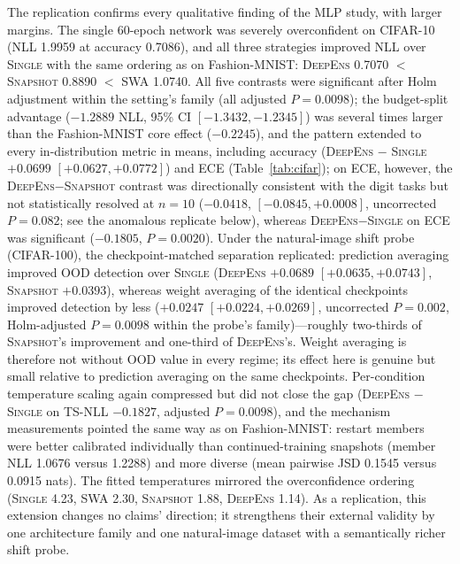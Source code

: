 \documentclass[11pt,a4paper]{article}
\newcommand{\deepens}{\textsc{DeepEns}}
\newcommand{\snapshot}{\textsc{Snapshot}}
\newcommand{\swa}{\textsc{SWA}}
\newcommand{\single}{\textsc{Single}}
\newcommand{\ts}{\textsc{TS}}
\begin{document}
The replication confirms every qualitative finding of the MLP study, with
larger margins. The single 60-epoch network was severely overconfident on
CIFAR-10 (NLL 1.9959 at accuracy 0.7086), and all three
strategies improved NLL over \single{} with the same ordering as on
Fashion-MNIST: \deepens{} 0.7070 $<$ \snapshot{} 0.8890 $<$ \swa{} 1.0740.
All five contrasts were significant after Holm adjustment within the
setting's family (all adjusted $P=0.0098$); the budget-split advantage
($-1.2889$ NLL, 95\% CI $[-1.3432,-1.2345]$) was several times larger than the
Fashion-MNIST core effect ($-0.2245$), and the pattern extended to every
in-distribution metric in means, including accuracy (\deepens{} $-$ \single{} $+0.0699$
$[+0.0627,+0.0772]$) and ECE (Table~\ref{tab:cifar}); on ECE, however, the
\deepens$-$\snapshot{} contrast was directionally consistent with the digit
tasks but not statistically resolved at $n=10$ ($-0.0418$,
$[-0.0845,+0.0008]$, uncorrected $P=0.082$; see the anomalous replicate
below), whereas \deepens$-$\single{} on ECE was significant ($-0.1805$,
$P=0.0020$). Under the
natural-image shift probe (CIFAR-100), the checkpoint-matched separation
replicated: prediction averaging improved OOD detection over \single{}
(\deepens{} $+0.0689$ $[+0.0635,+0.0743]$, \snapshot{} $+0.0393$), whereas
weight averaging of the identical checkpoints improved detection by less
($+0.0247$ $[+0.0224,+0.0269]$, uncorrected $P=0.002$, Holm-adjusted
$P=0.0098$ within the probe's family)---roughly two-thirds of \snapshot{}'s
improvement and one-third of \deepens{}'s. Weight averaging is therefore
not without OOD value in every regime; its effect here is genuine but
small relative to prediction averaging on the same checkpoints.
Per-condition temperature scaling again compressed but did not close the
gap (\deepens{} $-$ \single{} on \ts-NLL $-0.1827$, adjusted $P=0.0098$), and the
mechanism measurements pointed the same way as on Fashion-MNIST: restart
members were better calibrated individually than continued-training
snapshots (member NLL 1.0676 versus 1.2288) and more diverse
(mean pairwise JSD 0.1545 versus 0.0915 nats). The fitted
temperatures mirrored the overconfidence ordering
(\single{} 4.23, \swa{} 2.30, \snapshot{} 1.88, \deepens{} 1.14). As a replication, this
extension changes no claims' direction; it strengthens their external
validity by one architecture family and one natural-image dataset with a
semantically richer shift probe.
\end{document}
